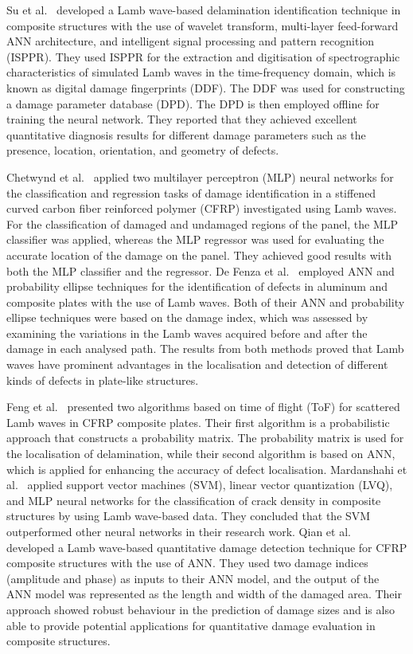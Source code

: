 \begin{sloppypar}
	Su et al.~\cite{Su2004a} developed a Lamb wave-based delamination identification technique in composite structures with the use of wavelet transform, multi-layer feed-forward ANN architecture, and intelligent signal processing and pattern recognition (ISPPR).
	They used ISPPR for the extraction and digitisation of spectrographic characteristics of simulated Lamb waves in the time-frequency domain, which is known as digital damage fingerprints (DDF).
	The DDF was used for constructing a damage parameter database (DPD). 
	The DPD is then employed offline for training the neural network.
	They reported that they achieved excellent quantitative diagnosis results for different damage parameters such as the presence, location, orientation, and geometry of defects.

	Chetwynd et al.~\cite{chetwynd2008damage} applied two multilayer perceptron (MLP) neural networks for the classification and regression tasks of damage identification in a stiffened curved carbon fiber reinforced polymer (CFRP) investigated using Lamb waves.
	For the classification of damaged and undamaged regions of the panel, the MLP classifier was applied, whereas the MLP regressor was used for evaluating the accurate location of the damage on the panel. 
	They achieved good results with both the MLP classifier and the regressor.
	De Fenza et al.~\cite{de2015application} employed ANN and probability ellipse techniques for the identification of defects in aluminum and composite plates with the use of Lamb waves.
	Both of their ANN and probability ellipse techniques were based on the damage index, which was assessed by examining the variations in the Lamb waves acquired before and after the damage in each analysed path.
	The results from both methods proved that Lamb waves have prominent advantages in the localisation and detection of different kinds of defects in plate-like structures.

	Feng et al.~\cite{feng2019locating} presented two algorithms based on time of flight (ToF) for scattered Lamb waves in CFRP composite plates.
	Their first algorithm is a probabilistic approach that constructs a probability matrix. 
	The probability matrix is used for the localisation of delamination, while their second algorithm is based on ANN, which is applied for enhancing the accuracy of defect localisation.
	Mardanshahi et al.~\cite{mardanshahi2020detection} applied support vector machines (SVM), linear vector quantization (LVQ), and MLP neural networks for the classification of crack density in composite structures by using Lamb wave-based data.
	They concluded that the SVM outperformed other neural networks in their research work.
	Qian et al.~\cite{qian2020application} developed a Lamb wave-based quantitative damage detection technique for CFRP composite structures with the use of ANN.
	They used two damage indices (amplitude and phase) as inputs to their ANN model, and the output of the ANN model was represented as the length and width of the damaged area.
	Their approach showed robust behaviour in the prediction of damage sizes and is also able to provide potential applications for quantitative damage evaluation in composite structures.


\end{sloppypar}
